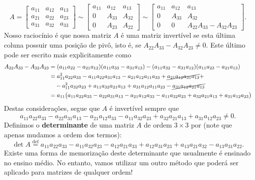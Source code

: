 \begin{equation}\label{notaminors}
A =
\begin{bmatrix}
a_{11} & a_{12} & a_{13} \\
a_{21} & a_{22} & a_{23} \\
a_{31} & a_{32} & a_{33}
\end{bmatrix} \sim
\begin{bmatrix}
a_{11} & a_{12} & a_{13} \\
0 & A_{33} & A_{32} \\
0 & A_{23} & A_{22}
\end{bmatrix} \sim
\begin{bmatrix}
a_{11} & a_{12} & a_{13} \\
0 & A_{33} & A_{32} \\
0 & 0 & A_{22} A_{33} - A_{32} A_{23}
\end{bmatrix}.
\end{equation}
Nosso raciocínio é que nossa matriz $A$ é uma matriz invertível se esta última coluna possuir uma posição de pivô, isto é, se $A_{22} A_{33} - A_{32} A_{23} \neq 0$. Este último pode ser escrito mais explicitamente como
\begin{equation}
  \begin{split}
    A_{22} A_{33} - A_{32} A_{23} & = (a_{11} a_{22} - a_{21} a_{12}) (a_{11} a_{33} - a_{31} a_{13}) - (a_{11} a_{32} - a_{31} a_{12}) (a_{11} a_{23} - a_{21} a_{13}) \\
    & =  a_{11}^2 a_{22} a_{33} - a_{11} a_{22} a_{31} a_{13} - a_{21} a_{12} a_{11} a_{33} + \cancel{a_{21} a_{12} a_{31} a_{13}} + \\
    & \quad  - a_{11}^2 a_{32} a_{23} + a_{11} a_{32} a_{21} a_{13} + a_{31} a_{12} a_{11} a_{23} - \cancel{a_{31} a_{12} a_{21} a_{13}} \\
    & = a_{11} \big( a_{11} a_{22} a_{33} - a_{22} a_{31} a_{13} - a_{21} a_{12} a_{33} - a_{11} a_{32} a_{23} + a_{32} a_{21} a_{13} + a_{31} a_{12} a_{23} \big)
  \end{split}
\end{equation}
Destas considerações, segue que $A$ é invertível sempre que
\begin{equation}
a_{11} a_{22} a_{33} - a_{22} a_{31} a_{13} - a_{21} a_{12} a_{33} - a_{11} a_{32} a_{23} + a_{32} a_{21} a_{13} + a_{31} a_{12} a_{23} \neq 0.
\end{equation} Definimos o \textbf{determinante} de uma matriz $A$ de ordem $3 \times 3$ por (note que apenas mudamos a ordem dos termos):
\begin{equation}
\det A \stackrel{\text{def}}{=} a_{11} a_{22} a_{33} - a_{11} a_{32} a_{23} - a_{12} a_{21} a_{33} + a_{12} a_{31} a_{23} + a_{13} a_{21} a_{32} - a_{13} a_{31} a_{22}.
\end{equation} Existe uma forma de memorização deste determinante que usualmente é ensinado no ensino médio. No entanto, vamos utilizar um outro método que poderá ser aplicado para matrizes de qualquer ordem!

